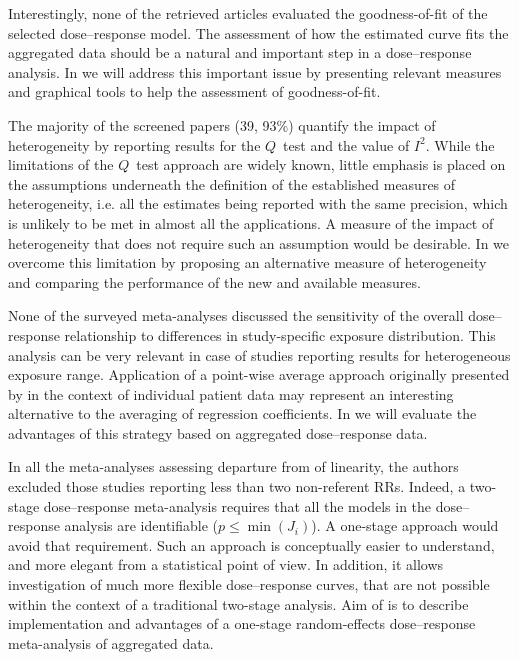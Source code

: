 \documentclass[11pt,a4paper,twoside,openany]{book}\usepackage{knitr}
\begin{document}
{\noindent Interestingly, none of the retrieved articles evaluated the goodness-of-fit of the selected dose--response model. The assessment of how the estimated curve fits the aggregated data should be a natural and important step in a dose--response analysis. In  we will address this important issue by presenting relevant measures and graphical tools to help the assessment of goodness-of-fit.

\noindent The majority of the screened papers (39, 93\%) quantify the impact of heterogeneity by reporting results for the $Q$~test and the value of $I^2$. While the limitations of the $Q$~test approach are widely known, little emphasis is placed on the assumptions underneath the definition of the established measures of heterogeneity, i.e.  all the estimates being reported with the same precision, which is unlikely to be met in almost all the applications. A measure of the impact of heterogeneity that does not require such an assumption would be desirable. In  we overcome this limitation by proposing an alternative measure of heterogeneity and comparing the performance of the new and available measures.

\noindent None of the surveyed meta-analyses discussed the sensitivity of the overall dose--response relationship to differences in study-specific exposure distribution. This analysis can be very relevant in case of studies reporting results for heterogeneous exposure range. Application of a point-wise average approach originally presented by \cite{sauerbrei2011new} in the context of individual patient data may represent an interesting alternative to the averaging of regression coefficients. In  we will evaluate the advantages of this strategy based on aggregated dose--response data.

\noindent In all the meta-analyses assessing departure from of linearity, the authors excluded those studies reporting less than two non-referent RRs. Indeed, a two-stage dose--response meta-analysis requires that all the models in the dose--response analysis are identifiable ($p \le \min\left(J_i\right)$). A one-stage approach would avoid that requirement. Such an approach is conceptually easier to understand, and more elegant from a statistical point of view. In addition, it allows investigation of much more flexible dose--response curves, that are not possible within the context of a traditional two-stage analysis. Aim of  is to describe implementation and advantages of a one-stage random-effects dose--response meta-analysis of aggregated data.

}
\end{document}
